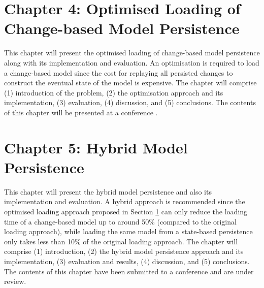 \documentclass[12pt, a4paper]{report} \usepackage[titletoc]{appendix}
\begin{document}

\section{Chapter 4: Optimised Loading of Change-based Model Persistence}
\label{sec:chapter_4_optimised_loading_change_based_model_persistence}
This chapter will present the optimised loading of change-based model persistence along with its implementation and evaluation. An optimisation is required to load a change-based model since the cost for replaying all persisted changes to construct the eventual state of the model is expensive. The chapter will comprise (1) introduction of the problem, (2) the optimisation approach and its implementation, (3) evaluation, (4) discussion, and (5) conclusions. The contents of this chapter will be presented at a conference \cite{yohannis2018towards}. 


\section{Chapter 5: Hybrid Model Persistence}
\label{sec:chapter_5_hybrid_model_persistence}
This chapter will present the hybrid model persistence and also its implementation and evaluation. A hybrid approach is recommended since the optimised loading approach proposed in Section \ref{sec:chapter_4_optimised_loading_change_based_model_persistence} can only reduce the loading time of a change-based model up to around 50\% (compared to the original loading approach), while loading the same model from a state-based persistence only takes less than 10\% of the original loading approach. The chapter will comprise (1) introduction, (2) the hybrid model persistence approach and its implementation, (3) evaluation and results, (4) discussion, and (5) conclusions. The contents of this chapter have been submitted to a conference \cite{yohannis2018hybrid} and are under review. 
\end{document}

